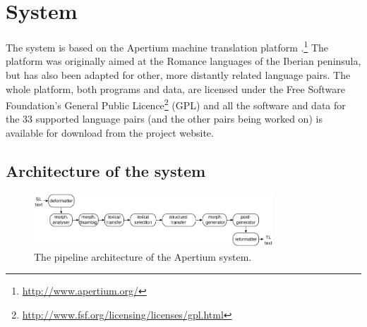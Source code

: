 \documentclass[10pt,a5paper,twoside]{article}
\begin{document}
\section{System}
\label{sec:sys}
The system is based on the Apertium machine translation platform \citep{apertium/2011}.\footnote{\url{http://www.apertium.org/}} The platform was originally aimed at the Romance languages of the Iberian peninsula, but has also been adapted for other, more distantly related language pairs. The whole platform, both programs and data, are licensed under the Free Software Foundation's General Public Licence\footnote{\url{http://www.fsf.org/licensing/licenses/gpl.html}} (GPL) and all the software and data for the 33 supported language pairs (and the other pairs being worked on) is available for download from the project website.

\subsection{Architecture of the system}

\begin{figure}[htbp]
\begin{center}
 \includegraphics[width=0.8\textwidth]{architecture.pdf}
\end{center}
\caption{The pipeline architecture of the Apertium system.}
\label{fig:modules}
\end{figure}
\end{document}
